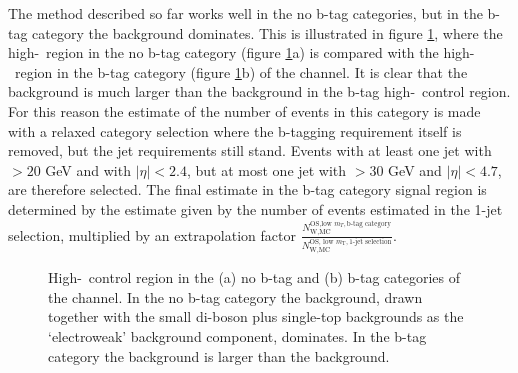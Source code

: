 The method described so far works well in the no b-tag categories, but in the b-tag category
the \ttbar background dominates. This is illustrated in figure \ref{fig:bkgs_highmtctrl}, where
the high-\mT~region in the no b-tag category (figure \ref{fig:bkgs_highmtctrl}a) is compared with the high-\mT~region in the 
b-tag category (figure \ref{fig:bkgs_highmtctrl}b) of the \etau channel. It is clear that the \ttbar 
background is much larger than the \Wjets background in the b-tag high-\mT~control region.
For this reason the estimate of the number
of \Wjets events in this category is made with a relaxed category selection where the b-tagging
requirement itself is removed, but the jet requirements still stand. Events with at least one 
jet with \pT$>20$ GeV and with $|\eta|<2.4$, but at most one jet with \pT$>30$ GeV and $|\eta|<4.7$, are therefore selected. The final \Wjets estimate in the b-tag category signal
region is determined by the estimate given by the number of \Wjets events
estimated in the 1-jet selection, multiplied by an extrapolation factor 
$\frac{N_{\text{W,MC}}^{\text{OS,low } m_{T},\text{b-tag category}}}{N_{\text{W,MC}}^{\text{OS, low }m_{\text{T}},\text{1-jet selection}}}$.
\begin{figure}[h!]
\begin{center}
\end{center}
\caption{High-\mT~control region in the (a) no b-tag and (b) b-tag categories of the \etau
channel. In the no b-tag category the \Wjets background, drawn together with the small
 di-boson plus single-top backgrounds as the `electroweak' background component, dominates. In the b-tag
category the \ttbar background is larger than the \Wjets background.}
\label{fig:bkgs_highmtctrl}
\end{figure}

